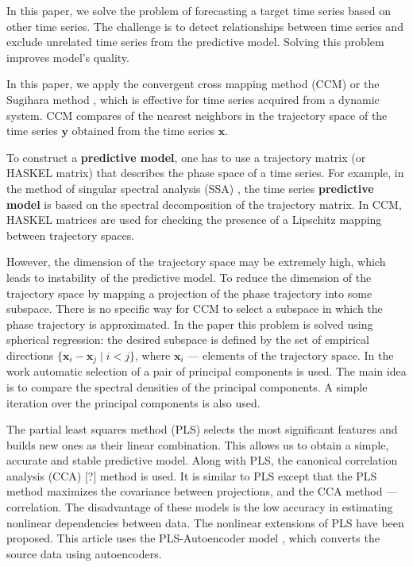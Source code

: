 \documentclass[bst/sn-mathphys]{sn-jnl}%
\newcommand{\bx}{\ensuremath{\mathbf{x}}}
\newcommand{\by}{\mathbf{y}}
\theoremstyle{thmstyleone}%
\theoremstyle{thmstyletwo}%
\theoremstyle{thmstylethree}%
\begin{document}
In this paper, we solve the problem of forecasting a target time series based on other time series.
The challenge is to detect relationships between time series and exclude unrelated time series from the predictive model.
Solving this problem improves model's quality.

In this paper, we apply the convergent cross mapping method (CCM) or the Sugihara method \cite{Sugihara90, sugihara1990nonlinear}, 
which is effective for time series acquired from a dynamic system.
CCM compares of the nearest neighbors in the trajectory space of the time series $\by$ obtained from the time series $\bx$.

To construct a \textbf{predictive model}, one has to use a trajectory matrix (or HASKEL matrix) that describes the phase space of a time series.
For example, in the method of singular spectral analysis (SSA) \cite {golyandina2005ssa, golyandina2001analysis, zhigljavsky2010singular}, the time series \textbf{predictive model} is based on the spectral decomposition of the trajectory matrix.
In CCM, HASKEL matrices are used for checking the presence of a Lipschitz mapping between trajectory spaces.

However, the dimension of the trajectory space may be extremely high, 
which leads to instability of the predictive model.
To reduce the dimension of the trajectory space by mapping a projection of the phase trajectory into some subspace. 
There is no specific way for CCM to select a subspace in which the phase trajectory is approximated.
In the paper \cite{usmanova2020sphere_regr} this problem is solved using spherical regression: the desired subspace is defined by the set of empirical directions $\{ \bx_i - \bx_j \mid i < j \}$, where $\bx_i \text{~--- elements of the trajectory space}$. 
In the work \cite{alexandrov2005automatic} automatic selection of a pair of principal components is used.
The main idea is to compare the spectral densities of the principal components. 
A simple iteration over the principal components \cite{usmanova2019dependencies} is also used.

The partial least squares method (PLS) \cite{rosipal2011nonlinear, rosipal2005overview} selects the most significant features and builds new ones as their linear combination.
This allows us to obtain a simple, accurate and stable predictive model.
Along with PLS, the canonical correlation analysis (CCA) [?] method is used. 
It is similar to PLS except that the PLS method maximizes the covariance between projections, and the CCA method — correlation.
The disadvantage of these models is the low accuracy in estimating nonlinear dependencies between data.
The nonlinear extensions of PLS \cite{qin1992nonlinear} have been proposed.
This article uses the PLS-Autoencoder model \cite{wiering2013neural}, which converts the source data using autoencoders.
\end{document}
